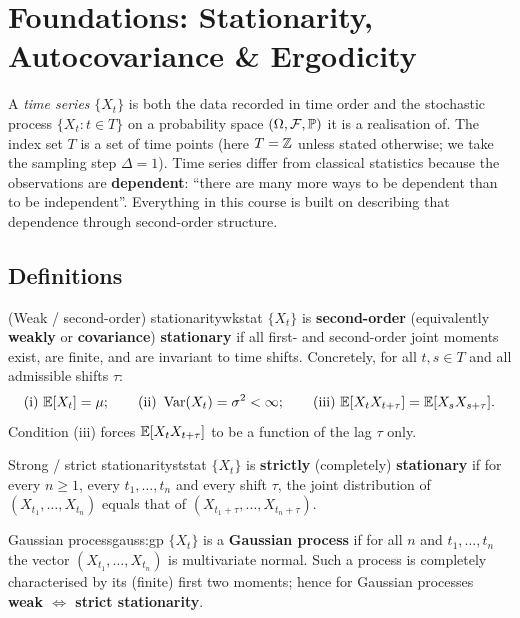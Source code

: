 \section{Foundations: Stationarity, Autocovariance \& Ergodicity}
\label{sec:foundations}

A \emph{time series} $\{X_t\}$ is both the data recorded in time order and the
stochastic process $\{X_t : t\in T\}$ on a probability space
$(\Omega,\mathcal F,\mathbb{P})$ it is a realisation of. The index set $T$ is a set
of time points (here $T=\mathbb{Z}$ unless stated otherwise; we take the sampling
step $\Delta=1$). Time series differ from classical statistics because the
observations are \textbf{dependent}: ``there are many more ways to be dependent
than to be independent''. Everything in this course is built on describing that
dependence through second-order structure.

\subsection{Definitions}

\begin{definition}{(Weak / second-order) stationarity}{wkstat}
$\{X_t\}$ is \textbf{second-order} (equivalently \textbf{weakly} or
\textbf{covariance}) \textbf{stationary} if all first- and second-order joint
moments exist, are finite, and are invariant to time shifts. Concretely, for
all $t,s\in T$ and all admissible shifts $\tau$:
\[
\text{(i) } \mathbb{E}[X_t]=\mu;\qquad
\text{(ii) } \operatorname{Var}(X_t)=\sigma^2<\infty;\qquad
\text{(iii) } \mathbb{E}[X_tX_{t+\tau}]=\mathbb{E}[X_sX_{s+\tau}].
\]
Condition (iii) forces $\mathbb{E}[X_tX_{t+\tau}]$ to be a function of the lag $\tau$
only.
\end{definition}

\begin{definition}{Strong / strict stationarity}{ststat}
$\{X_t\}$ is \textbf{strictly} (completely) \textbf{stationary} if for every
$n\ge1$, every $t_1,\dots,t_n$ and every shift $\tau$, the joint distribution
of $(X_{t_1},\dots,X_{t_n})$ equals that of
$(X_{t_1+\tau},\dots,X_{t_n+\tau})$.
\end{definition}

\begin{definition}{Gaussian process}{gauss:gp}
$\{X_t\}$ is a \textbf{Gaussian process} if for all $n$ and $t_1,\dots,t_n$ the
vector $(X_{t_1},\dots,X_{t_n})$ is multivariate normal. Such a process is
completely characterised by its (finite) first two moments; hence for Gaussian
processes \textbf{weak $\Leftrightarrow$ strict stationarity}.
\end{definition}

